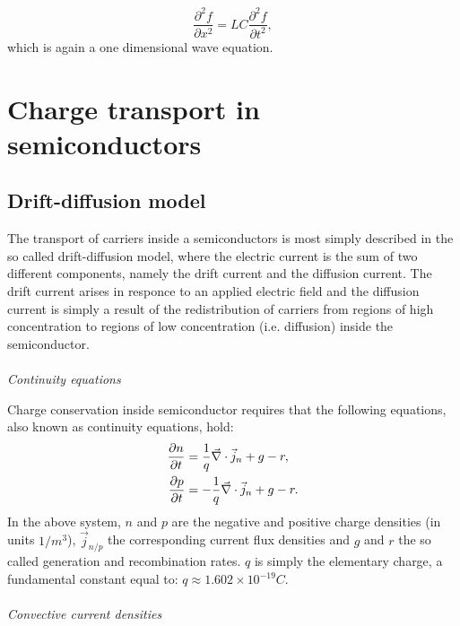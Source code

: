 \documentclass[10pt,a4paper]{report}
\def\Nabla{\ensuremath\vec{\nabla}}
\def\div{\ensuremath\Nabla\cdot}
\begin{document}
\begin{equation}
\frac{\partial^2 f}{\partial x^2} = LC\frac{\partial^2 f}{\partial t^2},
\end{equation}
which is again a one dimensional wave equation. 

\section{Charge transport in semiconductors}
\subsection*{Drift-diffusion model}

The transport of carriers inside a semiconductors is most simply described in the so called drift-diffusion model, where the electric current is the sum of two different components, namely the drift current and the diffusion current. The drift current arises in responce to an applied electric field and the diffusion current is simply a result of the redistribution of carriers from regions of high concentration to regions of low concentration (i.e. diffusion) inside the semiconductor.\\\\
\emph{Continuity equations} 

Charge conservation inside semiconductor requires that the following equations, also known as continuity equations, hold:
\begin{align}
  \frac{\partial n}{\partial t} &= \frac{1}{q} \div \vec{j}_n +g-r \label{eq:continuity_n_charge} ,\\
  \frac{\partial p}{\partial t} &= -\frac{1}{q} \div \vec{j}_n +g-r \label{eq:continuity_p_charge} .
\end{align}
In the above system, $n$ and $p$ are the negative and positive charge densities (in units $1/m^3$), $\vec{j}_{n/p}$ the corresponding current flux densities and $g$ and $r$ the so called generation and recombination rates. $q$ is simply 
the elementary charge, a fundamental constant equal to: $q \approx  1.602\times 10^{-19}C$. \\\\
\emph{Convective current densities}
\end{document}
